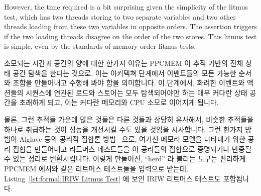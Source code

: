 However, the time required is a bit surprising given the simplicity
of the litmus test, which has two threads storing to two separate variables
and two other threads loading from these two variables in opposite
orders.
The assertion triggers if the two loading threads disagree on the order
of the two stores.
This litmus test is simple, even by the standards of memory-order litmus
tests.
\fi

소모되는 시간과 공간의 양에 대한 한가지 이유는 PPCMEM 이 추적 기반의 전체 상태
공간 탐색을 한다는 것으로, 이는 아키텍쳐 단계에서 이벤트들의 모든 가능한 순서와
조합을 만들어내고 수행해 봐야 함을 의미합니다.
이 단계에서, 화려한 이벤트와 액션들의 시퀀스에 연관된 로드와 스토어는 모두
탐색되어야만 하는 매우 커다란 상태 공간을 초래하게 되고, 이는 커다란 메모리와
CPU 소모로 이어지게 됩니다.

물론, 그런 추적들 가운데 많은 것들은 다른 것들과 상당히 유사해서, 비슷한
추적들을 하나로 취급하는 것이 성능을 개선시킬 수도 있을 것임을 시사합니다.
그런 한가지 방법이 Alglave 등의 공리적 집합론
방법~\cite{Alglave:2014:HCM:2594291.2594347} 으로, 여기선 메모리 모델을
나타내기 위한 공리 집합을 만들어내고 리트머스 테스트들을 이 공리들의 집합으로
증명되거나 반증될 수 있는 정리로 변환시킵니다.
이렇게 만들어진, ``herd'' 라 불리는 도구는 편리하게 PPCMEM 에서와 같은 리트머스
테스트들을 입력으로 받는데,
Listing~\ref{lst:formal:IRIW Litmus Test} 에 보인 IRIW 리트머스 테스트도
포함됩니다.
\iffalse

One reason for the amount of time and space consumed is that PPCMEM does
a trace-based full-state-space search, which means that it must generate
and evaluate all possible orders and combinations of events at the
architectural level.
At this level, both loads and stores correspond to ornate sequences
of events and actions, resulting in a very large state space that must
be completely searched, in turn resulting in large memory and CPU
consumption.

Of course, many of the traces are quite similar to one another, which
suggests that an approach that treated similar traces as one might
improve performace.
One such approach is the axiomatic approach of
Alglave et al.~\cite{Alglave:2014:HCM:2594291.2594347},
which creates a set of axioms to represent the memory model and then
converts litmus tests to theorems that might be proven or disproven
over this set of axioms.
The resulting tool, called ``herd'',  conveniently takes as input the
same litmus tests as PPCMEM, including the IRIW litmus test shown in
Listing~\ref{lst:formal:IRIW Litmus Test}.
\fi

